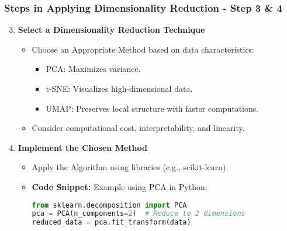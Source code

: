 \documentclass[aspectratio=169]{beamer}
\begin{document}
\begin{frame}[fragile]
    \frametitle{Steps in Applying Dimensionality Reduction - Step 3 & 4}
    
    \begin{enumerate}
        \setcounter{enumi}{2} %
        \item \textbf{Select a Dimensionality Reduction Technique}
        \begin{itemize}
            \item Choose an Appropriate Method based on data characteristics:
            \begin{itemize}
                \item PCA: Maximizes variance.
                \item t-SNE: Visualizes high-dimensional data.
                \item UMAP: Preserves local structure with faster computations.
            \end{itemize}
            \item Consider computational cost, interpretability, and linearity.
        \end{itemize}

        \item \textbf{Implement the Chosen Method}
        \begin{itemize}
            \item Apply the Algorithm using libraries (e.g., scikit-learn).
            \item \textbf{Code Snippet:} Example using PCA in Python:
            \begin{lstlisting}[language=Python]
from sklearn.decomposition import PCA
pca = PCA(n_components=2)  # Reduce to 2 dimensions
reduced_data = pca.fit_transform(data)
            \end{lstlisting}
        \end{itemize}
    \end{enumerate}
\end{frame}
\end{document}
